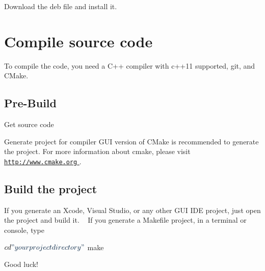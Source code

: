  Download the deb file and install it.\hypertarget{_installation_source}{}\section{Compile source code}\label{_installation_source}
To compile the code, you need a C++ compiler with c++11 supported, git, and C\+Make.\hypertarget{_installation_pre_source}{}\subsection{Pre-\/\+Build}\label{_installation_pre_source}
\begin{DoxyParagraph}{Get source code}

 
\end{DoxyParagraph}
\begin{DoxyParagraph}{Generate project for compiler}
G\+U\+I version of C\+Make is recommended to generate the project. For more information about cmake, please visit \hyperlink{}{\href{http://www.cmake.org}{\tt http\+://www.\+cmake.\+org} }.
\end{DoxyParagraph}
\hypertarget{_installation_compile_source}{}\subsection{Build the project}\label{_installation_compile_source}
If you generate an Xcode, Visual Studio, or any other G\+U\+I I\+D\+E project, just open the project and build it. ~\newline
 If you generate a Makefile project, in a terminal or console, type 
\begin{DoxyCode}
$ cd \textcolor{stringliteral}{"your project directory"}
$ make
\end{DoxyCode}
 Good luck! 